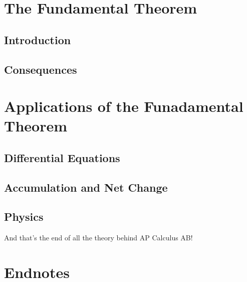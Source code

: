 \documentclass{article}
\begin{document}
\section{The Fundamental Theorem}
\subsection{Introduction}
\subsection{Consequences}
\newpage
\section{Applications of the Funadamental Theorem}
\subsection{Differential Equations}
\subsection{Accumulation and Net Change}\newpage
\subsection{Physics}
\newline\vspace{2in}
\begin{center}
And that's the end of all the theory behind AP Calculus AB!
\end{center}
\newpage
\section{Endnotes}
\end{document}

